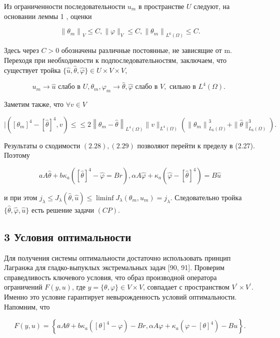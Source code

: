 \documentclass[10pt]{article}
\begin{document}
Из ограниченности последовательности $u_{m}$ в пространстве $U$ следуют, на основании леммы 1 , оценки

$$
\left\|\theta_{m}\right\|_{V} \leqslant C,\|\varphi\|_{V} \leqslant C,\left\|\theta_{m}\right\|_{L^{6}(\Omega)} \leqslant C .
$$

Здесь через $C>0$ обозначены различные постоянные, не зависящие от $\mathrm{m}$. Переходя при необходимости к подпоследовательностям, заключаем, что существует тройка $\{\hat{u}, \hat{\theta}, \hat{\varphi}\} \in U \times V \times V$,

$$
u_{m} \rightarrow \hat{u} \text { слабо в } U, \theta_{m}, \varphi_{m} \rightarrow \hat{\theta}, \hat{\varphi} \text { слабо в } V, \text { сильно в } L^{4}(\Omega) \text {. }
$$

Заметим также, что $\forall v \in V$

$$
\mid\left(\left[\theta_{m}\right]^{4}-[\hat{\theta}]^{4}, v\right) \leqslant \leqslant 2\left\|\theta_{m}-\hat{\theta}\right\|_{L^{4}(\Omega)}\|v\|_{L^{4}(\Omega)}\left(\left\|\theta_{m}\right\|_{L_{6}(\Omega)}^{3}+\|\hat{\theta}\|_{L_{6}(\Omega)}^{3}\right) .
$$

Результаты о сходимости $(2.28),(2.29)$ позволяют перейти к пределу в (2.27). Поэтому

$$
a A \hat{\theta}+b \kappa_{a}\left([\hat{\theta}]^{4}-\hat{\varphi}=B r\right), \alpha A \hat{\varphi}+\kappa_{a}\left(\hat{\varphi}-[\hat{\theta}]^{4}\right)=B \hat{u}
$$

и при этом $j_{\lambda} \leqslant J_{\lambda}(\hat{\theta}, \hat{u}) \leqslant \liminf J_{\lambda}\left(\theta_{m}, u_{m}\right)=j_{\lambda}$. Следовательно тройка $\{\hat{\theta}, \hat{\varphi}, \hat{u}\}$ есть решение задачи $(C P)$.

\subsection{3 Условия оптимальности}
Для получения системы оптимальности достаточно использовать принцип Лагранжа для гладко-выпуклых экстремальных задач [90, 91]. Проверим справедливость ключевого условия, что образ производной оператора ограничений $F(y, u)$, где $y=\{\theta, \varphi\} \in V \times V$, совпадает с пространством $V^{\prime} \times V^{\prime}$. Именно это условие гарантирует невырожденность условий оптимальности. Напомним, что

$$
F(y, u)=\left\{a A \theta+b \kappa_{a}\left([\theta]^{4}-\varphi\right)-B r, \alpha A \varphi+\kappa_{a}\left(\varphi-[\theta]^{4}\right)-B u\right\} .
$$
\end{document}
